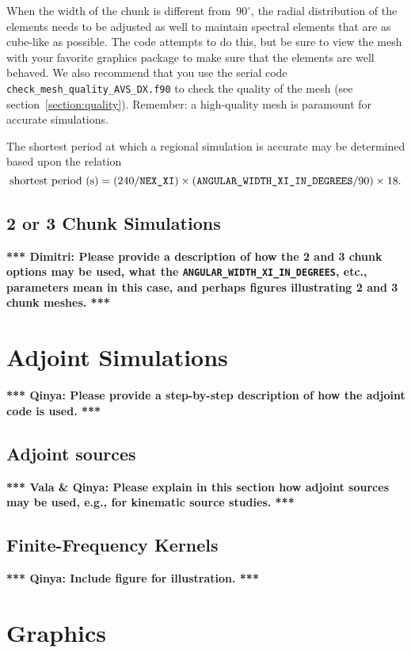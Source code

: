 \documentclass[onecolumn]{article}
\newcommand{\tovalaqinya}[1]{\textbf{*** Vala \& Qinya: #1 ***}}
\newcommand{\toqinya}[1]{\textbf{*** Qinya: #1 ***}}
\newcommand{\todimitri}[1]{\textbf{*** Dimitri: #1 ***}}
\newcommand{\nexxi}{\mbox{\texttt{NEX\_XI}}}
\begin{document}
When the width of the chunk is different from~$90^\circ$, the radial
distribution of the elements needs to be adjusted as well to maintain
spectral elements that are as cube-like as possible. The code attempts
to do this, but be sure to view the mesh with your favorite graphics
package to make sure that the elements are well behaved.
We also recommend that you use the serial code
\texttt{check\_mesh\_quality\_AVS\_DX.f90} to check the quality of the mesh
(see section~\ref{section:quality}). Remember: a high-quality mesh
is paramount for accurate simulations.

The shortest period at which a regional simulation is accurate may be determined based
upon the relation
\begin{equation}
\mbox{shortest period (s)} = (240/\nexxi)\times
(\texttt{ANGULAR\_WIDTH\_XI\_IN\_DEGREES}/90)\times 18.
\label{eq:shortest_period_regional}
\end{equation}

\subsection{2 or 3 Chunk Simulations}

\todimitri{Please provide a description of how the 2 and 3 chunk options may be used,
what the \texttt{ANGULAR\_WIDTH\_XI\_IN\_DEGREES}, etc., parameters mean
in this case, and perhaps figures illustrating 2 and 3 chunk meshes.}

\section{Adjoint Simulations}

\toqinya{Please provide a step-by-step description of how the adjoint code
is used.}

\subsection{Adjoint sources}

\tovalaqinya{Please explain in this section how adjoint sources may be used,
e.g., for kinematic source studies.}

\subsection{Finite-Frequency Kernels}

\toqinya{Include figure for illustration.}

\section{Graphics}
\end{document}
